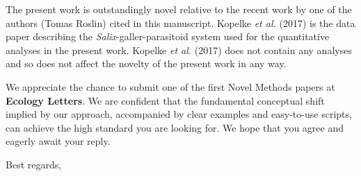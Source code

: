\documentclass[12pt]{letter}
\begin{document}
\begin{letter}
    The present work is outstandingly novel relative to the recent work by one of the authors (Tomas Roslin) cited in this manuscript. Kopelke \emph{et al.} (2017) is the data paper describing the \emph{Salix}-galler-parasitoid system used for the quantitative analyses in the present work. Kopelke \emph{et al.} (2017) does not contain any analyses and so does not affect the novelty of the present work in any way.


    We appreciate the chance to submit one of the first Novel Methods papers at \textbf{Ecology Letters}. We are confident that the fundamental conceptual shift implied by our approach, accompanied by clear examples and easy-to-use scripts, can achieve the high standard you are looking for. We hope that you agree and eagerly await your reply.


\closing{Best regards,}


\end{letter}
\end{document}
